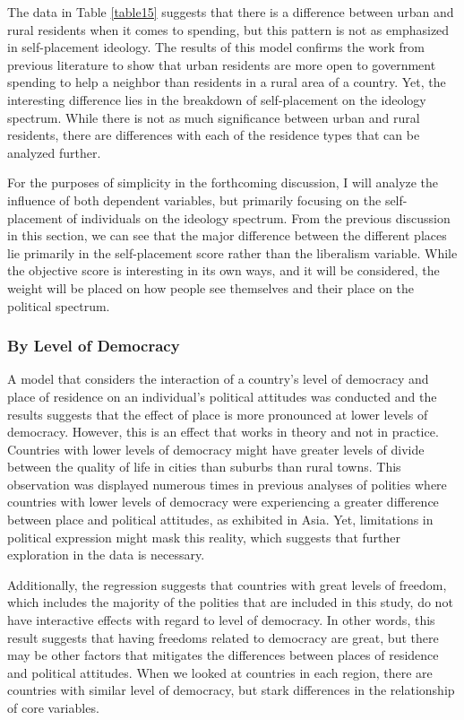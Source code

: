 \documentclass[12pt, titlepage]{article}
\begin{document}
The data in Table \ref{table15} suggests that there is a difference between urban and rural residents when it comes to spending, but this pattern is not as emphasized in self-placement ideology. The results of this model confirms the work from previous literature to show that urban residents are more open to government spending to help a neighbor than residents in a rural area of a country. Yet, the interesting difference lies in the breakdown of self-placement on the ideology spectrum. While there is not as much significance between urban and rural residents, there are differences with each of the residence types that can be analyzed further.

For the purposes of simplicity in the forthcoming discussion, I will analyze the influence of both dependent variables, but primarily focusing on the self-placement of individuals on the ideology spectrum. From the previous discussion in this section, we can see that the major difference between the different places lie primarily in the self-placement score rather than the liberalism variable. While the objective score is interesting in its own ways, and it will be considered, the weight will be placed on how people see themselves and their place on the political spectrum. 

\subsubsection{By Level of Democracy}

A model that considers the interaction of a country's level of democracy and place of residence on an individual's political attitudes was conducted and the results suggests that the effect of place is more pronounced at lower levels of democracy. However, this is an effect that works in theory and not in practice. Countries with lower levels of democracy might have greater levels of divide between the quality of life in cities than suburbs than rural towns. This observation was displayed numerous times in previous analyses of polities where countries with lower levels of democracy were experiencing a greater difference between place and political attitudes, as exhibited in Asia. Yet, limitations in political expression might mask this reality, which suggests that further exploration in the data is necessary. 

Additionally, the regression suggests that countries with great levels of freedom, which includes the majority of the polities that are included in this study, do not have interactive effects with regard to level of democracy. In other words, this result suggests that having freedoms related to democracy are great, but there may be other factors that mitigates the differences between places of residence and political attitudes. When we looked at countries in each region, there are countries with similar level of democracy, but stark differences in the relationship of core variables.
\end{document}
